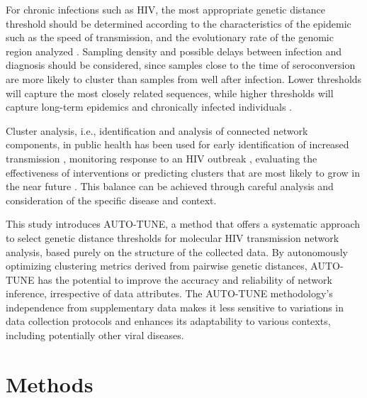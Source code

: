\documentclass[utf8]{FrontiersinHarvard} %
\begin{document}
For chronic infections such as HIV, the most appropriate genetic distance
threshold should be determined according to the characteristics of the epidemic
such as the speed of transmission, and the evolutionary rate of the genomic region
analyzed \citep{liu_dynamics_2020}. Sampling density and possible delays
between infection and diagnosis should be considered, since samples close to
the time of seroconversion are more likely to cluster than samples from well
after infection. Lower thresholds will capture the most closely related
sequences, while higher thresholds will capture long-term epidemics and
chronically infected individuals \citep{junqueira_factors_2019}.

Cluster analysis, i.e., identification and analysis of connected network
components, in public health has been used for early identification of
increased transmission \citep{oster_hiv_2021, oster_identifying_2018},
monitoring response to an HIV outbreak \citep{tumpney_human_2020,
sizemore_using_2020, tookes_rapid_2020}, evaluating the effectiveness of
interventions \citep{peters_hiv_2016,wang_targeting_2015,liu_dynamics_2020} or
predicting clusters that are most likely to grow in the near future
\citep{erly_predictive_2021,ragonnet-cronin_forecasting_2022}. This balance can
be achieved through careful analysis and consideration of the specific disease
and context.

This study introduces AUTO-TUNE, a method that offers a systematic approach to
select genetic distance thresholds for molecular HIV transmission network
analysis, based purely on the structure of the collected data. By autonomously
optimizing clustering metrics derived from pairwise genetic distances,
AUTO-TUNE has the potential to improve the accuracy and reliability of network
inference, irrespective of data attributes. The AUTO-TUNE methodology's
independence from supplementary data makes it less sensitive to variations in
data collection protocols and enhances its adaptability to various contexts,
including potentially other viral diseases.

\section{Methods}
\end{document}
